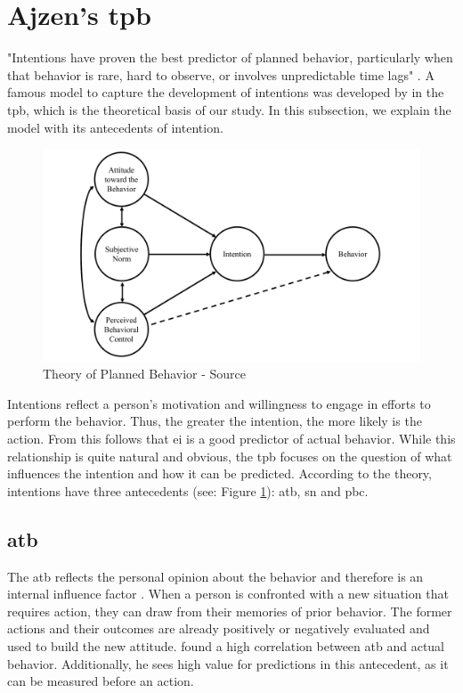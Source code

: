 \section{Ajzen's \acl{tpb}}
\label{sec:eim}
"Intentions have proven the best predictor of planned behavior, particularly when that behavior is rare, hard to observe, or involves unpredictable time lags" \citep[p. 411]{krueger2000competing}.
A famous model to capture the development of intentions was developed by \citet{ajzen1991theory} in the \acf{tpb}, which is the theoretical basis of our study. In this subsection, we explain the model with its antecedents of intention.

\begin{figure}[h]
\begin{center}
\includegraphics[width=16cm]{images/Ajzen.pdf}
\caption{Theory of Planned Behavior - Source \citep{ajzen1991theory}}
\label{fig:Ajzen}
\end{center}
\end{figure}

Intentions reflect a person's motivation and willingness to engage in efforts to perform the behavior. Thus, the greater the intention, the more likely is the action. From this follows that \acf{ei} is a good predictor of actual behavior. While this relationship is quite natural and obvious, the \ac{tpb} focuses on the question of what influences the intention and how it can be predicted. According to the theory, intentions have three antecedents (see: Figure \ref{fig:Ajzen}): \acf{atb}, \acf{sn} and \acf{pbc}.

\subsection{\acl{atb}}
The \ac{atb} reflects the personal opinion about the behavior and therefore is an internal influence factor \citep{ajzen1985intentions}. When a person is confronted with a new situation that requires action, they can draw from their memories of prior behavior. The former actions and their outcomes are already positively or negatively evaluated and used to build the new attitude.
\citet{ajzen1988attitudes} found a high correlation between \ac{atb} and actual behavior. 
Additionally, he sees high value for predictions in this antecedent, as it can be measured before an action.

